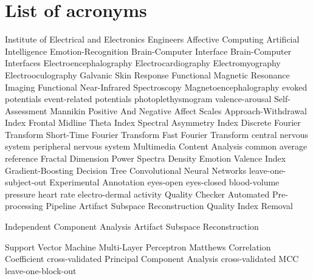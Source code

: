 \chapter{List of acronyms}

\begin{acronym}[TDMAAA]
					{Institute of Electrical and Electronics Engineers}
					{Affective Computing}	
					{Artificial Intelligence}
    			   {Emotion-Recognition}
    			   {Brain-Computer Interface}
    			   {Brain-Computer Interfaces}
    			   {Electroencephalography}
    				{Electrocardiography}
    		{Electromyography}
    	 	{Electrooculography}
    		{Galvanic Skin Response}
               {Functional Magnetic Resonance Imaging}
              {Functional Near-Infrared Spectroscopy}
               {Magnetoencephalography}
               {evoked potentials}
    		  {event-related potentials}
            {photoplethysmogram}
            {valence-arousal}
    		{Self-Assessment Mannikin}
    		{Positive And Negative Affect Scales}
    		{Approach-Withdrawal Index}
    		{Frontal Midline Theta Index}
    		{Spectral Asymmetry Index}
    		{Discrete Fourier Transform}
       {Short-Time Fourier Transform}
    		{Fast Fourier Transform}
    		{central nervous system}
    		{peripheral nervous system}
    		{Multimedia Content Analysis}	
    		{common average reference}
    		{Fractal Dimension}
    		{Power Spectra Density}
    		{Emotion Valence Index}
    		{Gradient-Boosting Decision Tree}
    		{Convolutional Neural Networks}
    		{leave-one-subject-out}
    		{Experimental Annotation}
    		{eyes-open}
    		{eyes-closed}
    		{blood-volume pressure}
    		{heart rate}
    		{electro-dermal activity}
    		{Quality Checker}
    		{Automated Pre-processing Pipeline}
    		{Artifact Subspace Reconstruction}
    		{Quality Index Removal}
    
    
    
    		{Independent Component Analysis}
    		{Artifact Subspace Reconstruction}
    
    		{Support Vector Machine}
    		{Multi-Layer Perceptron}
    		{Matthews Correlation Coefficient}
			{cross-validated}
    		{Principal Component Analysis}
    		{cross-validated MCC}
    		{leave-one-block-out}
\end{acronym}

